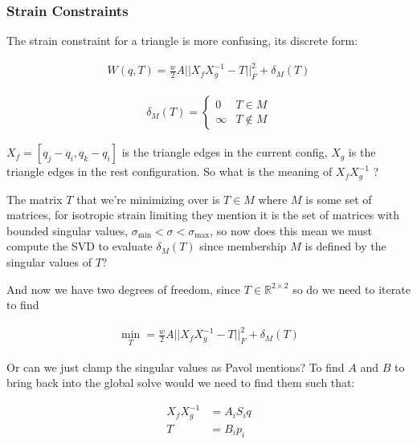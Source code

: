 \documentclass[11pt]{article}
\begin{document}
\subsubsection{Strain Constraints}

The strain constraint for a triangle is more confusing, its discrete form:

\begin{align}
	W(q, T) = \frac{w}{2} A || X_f X^{-1}_g - T ||^2_F + \delta_M (T)
\end{align}

\begin{align*}
	\delta_M (T) = \begin{cases}
		0 & T \in M \\
		\infty & T \not\in M
	\end{cases}
\end{align*}

$X_f = [q_j - q_i, q_k - q_i]$ is the triangle edges in the current config, $X_g$ is the triangle edges
in the rest configuration. So what is the meaning of $X_f X^{-1}_g$ ?

The matrix $T$ that we're minimizing over is $T \in M$ where $M$ is some set of matrices, for isotropic strain
limiting they mention it is the set of matrices with bounded singular values, $\sigma_{\min} < \sigma < \sigma_{\max}$,
so now does this mean we must compute the SVD to evaluate $\delta_M (T)$ since membership $M$ is defined by
the singular values of $T$?

And now we have two degrees of freedom, since $T \in \mathbb{R}^{2 \times 2}$ so do we need to iterate to find

\begin{align}
	\min_T = \frac{w}{2} A || X_f X^{-1}_g - T ||^2_F + \delta_M (T)
\end{align}

Or can we just clamp the singular values as Pavol mentions? To find $A$ and $B$ to bring back into the global
solve would we need to find them such that:

\begin{align}
	X_f X^{-1}_g &= A_i S_i q \\
	T &= B_i p_i
\end{align}
\end{document}
